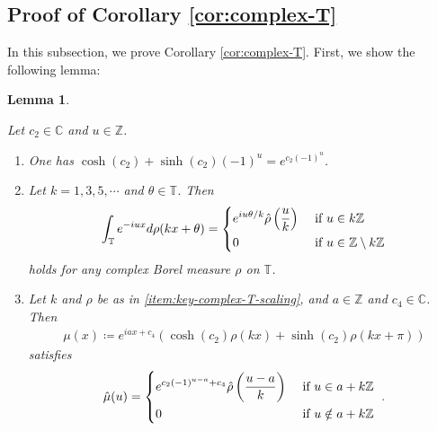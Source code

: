 \documentclass[12pt]{article}
\newtheorem{lemma}[theorem]{Lemma}
\theoremstyle{definition}
\theoremstyle{remark}
\numberwithin{equation}{section}
\numberwithin{figure}{section}
\numberwithin{table}{section}
\begin{document}
\subsection{Proof of Corollary \ref{cor:complex-T}}
\label{subsec:complex-T}

In this subsection, we prove Corollary \ref{cor:complex-T}.
First, we show the following lemma:

\begin{lemma}
\label{lem:key-complex-T}

Let $ c_2 \in \mathbb{ C } $ and $ u \in \mathbb{ Z } $.

\begin{enumerate}
    \item \label{item:key-complex-T-hyperbolic}

One has $ \cosh ( c_2 ) + \sinh ( c_2 ) ( - 1 )^u = e^{ c_2 ( - 1 )^u } $.

\item \label{item:key-complex-T-scaling}

Let $ k = 1 , 3 , 5 , \cdots $ and $ \theta \in \mathbb{ T } $.
Then
\begin{align}
    \int_{ \mathbb{ T } } e^{ - i u x } d \rho ( k x + \theta )
    =
    \left\{
    \begin{aligned}
       & e^{ i u \theta / k } \hat{ \rho } \left( \frac{ u }{ k } \right)  & & \text{ if $ u \in k \mathbb{ Z } $} \\
       & 0 & & \text{ if $ u \in \mathbb{ Z } \setminus k \mathbb{ Z } $}
    \end{aligned}
    \right. \label{eq:key-complex-T-scaling-conclude}
\end{align}
holds for any complex Borel measure $ \rho $ on $ \mathbb{ T } $.

\item \label{item:key-complex-T-main}

Let $ k $ and $ \rho $ be as in \ref{item:key-complex-T-scaling}, and $ a \in \mathbb{ Z } $ and $ c_4 \in \mathbb{ C } $.
Then
\begin{align}
    \mu ( x ) \coloneqq e^{ i a x + c_4 } ( \cosh ( c_2 ) \rho ( k x ) + \sinh ( c_2 ) \rho ( k x + \pi ) ) \label{eq:key-complex-T-main-mu-definition}
\end{align}
satisfies
\begin{align}
    \hat{ \mu } ( u )
    =
  \left\{
  \begin{aligned}
    & e^{ c_2 ( - 1 )^{ u - a } + c_4 } \hat{ \rho } \left( \frac{ u - a }{ k } \right) & & \text{ if $ u \in a + k \mathbb{ Z } $} \\
    & 0 & & \text{ if $ u \notin a + k \mathbb{ Z } $ }
  \end{aligned}
  \right. . \label{eq:key-complex-T-main-conclude}
\end{align}
    
\end{enumerate}

\end{lemma}
\end{document}
